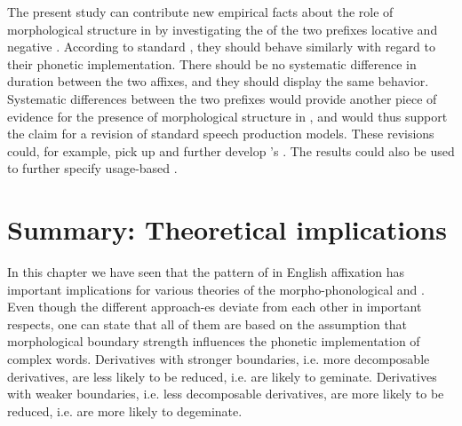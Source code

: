 {{{ 

 
 
 The present study can contribute new empirical facts about the role of morphological structure in  by investigating the  of the two  prefixes locative and negative . According to standard , they should behave similarly with regard to their phonetic implementation. There should be no systematic difference in duration between the two affixes, and they should display the same  behavior. Systematic differences between the two prefixes would provide another piece of evidence for the presence of morphological structure in , and would thus support the claim for a revision of standard speech production models. These revisions could, for example, pick up and further develop \citeauthor{CohenGoldberg.2013}'s  . The results could also be used to further specify usage-based .



 
 




\section{Summary: Theoretical implications}\label{summary predictions}

 In this chapter we have seen that the pattern of  in English affixation has important implications for various theories of the morpho-phonological and . Even though the different approach-es deviate from each other in important respects, one can state that all of them are based on the assumption that morphological boundary strength influences the phonetic implementation of complex words. Derivatives with stronger boundaries, i.e. more decomposable derivatives, are less likely to be reduced, i.e. are likely to geminate. Derivatives with weaker boundaries, i.e. less decomposable derivatives, are more likely to be reduced, i.e. are more likely to degeminate. 
 

}}}

